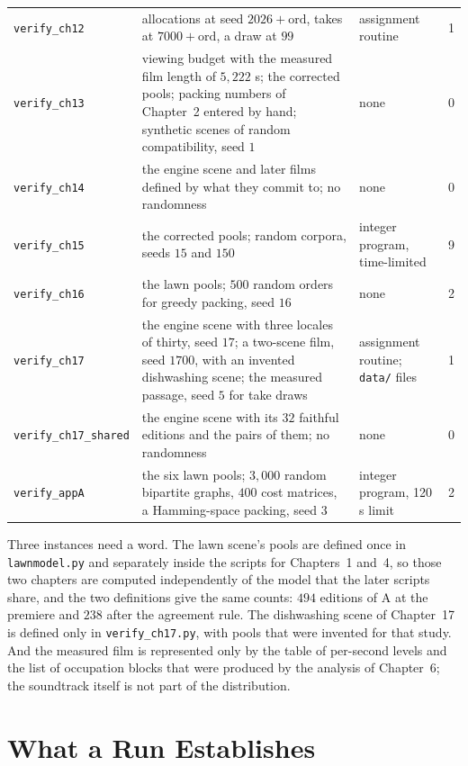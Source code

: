 \documentclass[11pt,twoside,openright]{book}
\theoremstyle{plain}
\theoremstyle{definition}
\theoremstyle{remark}
\begin{document}
\begin{longtable}{@{}>{\raggedright\arraybackslash}p{2.6cm}>{\raggedright\arraybackslash}p{6.0cm}>{\raggedright\arraybackslash}p{2.4cm}r@{}}
\texttt{verify\_ch12} & allocations at seed $2026+\mathrm{ord}$, takes at $7000+\mathrm{ord}$, a draw at $99$ & assignment routine & 1\\
\texttt{verify\_ch13} & viewing budget with the measured film length of $5{,}222$ s; the corrected pools; packing numbers of Chapter~2 entered by hand; synthetic scenes of random compatibility, seed $1$ & none & 0\\
\texttt{verify\_ch14} & the engine scene and later films defined by what they commit to; no randomness & none & 0\\
\texttt{verify\_ch15} & the corrected pools; random corpora, seeds $15$ and $150$ & integer program, time-limited & 9\\
\texttt{verify\_ch16} & the lawn pools; $500$ random orders for greedy packing, seed $16$ & none & 2\\
\texttt{verify\_ch17} & the engine scene with three locales of thirty, seed $17$; a two-scene film, seed $1700$, with an invented dishwashing scene; the measured passage, seed $5$ for take draws & assignment routine; \texttt{data/} files & 1\\
\texttt{verify\_ch17\_\allowbreak shared} & the engine scene with its $32$ faithful editions and the pairs of them; no randomness & none & 0\\
\texttt{verify\_appA} & the six lawn pools; $3{,}000$ random bipartite graphs, $400$ cost matrices, a Hamming-space packing, seed $3$ & integer program, 120 s limit & 2\\
\end{longtable}

Three instances need a word. The lawn scene's pools are defined once in \texttt{lawnmodel.py} and separately inside the scripts for Chapters~1 and~4, so those two chapters are computed independently of the model that the later scripts share, and the two definitions give the same counts: $494$ editions of A at the premiere and $238$ after the agreement rule. The dishwashing scene of Chapter~17 is defined only in \texttt{verify\_ch17.py}, with pools that were invented for that study. And the measured film is represented only by the table of per-second levels and the list of occupation blocks that were produced by the analysis of Chapter~6; the soundtrack itself is not part of the distribution.

\section{What a Run Establishes}\label{sec:establish}
\end{document}
